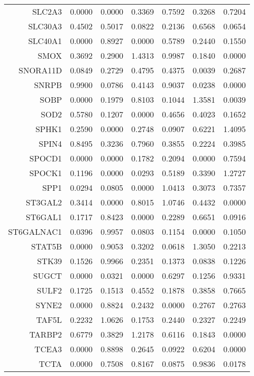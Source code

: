 \begin{longtable}{rrrrrrr}
  SLC2A3 & 0.0000 & 0.0000 & 0.3369 & 0.7592 & 0.3268 & 0.7204 \\ 
  SLC30A3 & 0.4502 & 0.5017 & 0.0822 & 0.2136 & 0.6568 & 0.0654 \\ 
  SLC40A1 & 0.0000 & 0.8927 & 0.0000 & 0.5789 & 0.2440 & 0.1550 \\ 
  SMOX & 0.3692 & 0.2900 & 1.4313 & 0.9987 & 0.1840 & 0.0000 \\ 
  SNORA11D & 0.0849 & 0.2729 & 0.4795 & 0.4375 & 0.0039 & 0.2687 \\ 
  SNRPB & 0.9900 & 0.0786 & 0.4143 & 0.9037 & 0.0238 & 0.0000 \\ 
  SOBP & 0.0000 & 0.1979 & 0.8103 & 0.1044 & 1.3581 & 0.0039 \\ 
  SOD2 & 0.5780 & 0.1207 & 0.0000 & 0.4656 & 0.4023 & 0.1652 \\ 
  SPHK1 & 0.2590 & 0.0000 & 0.2748 & 0.0907 & 0.6221 & 1.4095 \\ 
  SPIN4 & 0.8495 & 0.3236 & 0.7960 & 0.3855 & 0.2224 & 0.3985 \\ 
  SPOCD1 & 0.0000 & 0.0000 & 0.1782 & 0.2094 & 0.0000 & 0.7594 \\ 
  SPOCK1 & 0.1196 & 0.0000 & 0.0293 & 0.5189 & 0.3390 & 1.2727 \\ 
  SPP1 & 0.0294 & 0.0805 & 0.0000 & 1.0413 & 0.3073 & 0.7357 \\ 
  ST3GAL2 & 0.3414 & 0.0000 & 0.8015 & 1.0746 & 0.4432 & 0.0000 \\ 
  ST6GAL1 & 0.1717 & 0.8423 & 0.0000 & 0.2289 & 0.6651 & 0.0916 \\ 
  ST6GALNAC1 & 0.0396 & 0.9957 & 0.0803 & 0.1154 & 0.0000 & 0.1050 \\ 
  STAT5B & 0.0000 & 0.9053 & 0.3202 & 0.0618 & 1.3050 & 0.2213 \\ 
  STK39 & 0.1526 & 0.9966 & 0.2351 & 0.1373 & 0.0838 & 0.1226 \\ 
  SUGCT & 0.0000 & 0.0321 & 0.0000 & 0.6297 & 0.1256 & 0.9331 \\ 
  SULF2 & 0.1725 & 0.1513 & 0.4552 & 0.1878 & 0.3858 & 0.7665 \\ 
  SYNE2 & 0.0000 & 0.8824 & 0.2432 & 0.0000 & 0.2767 & 0.2763 \\ 
  TAF5L & 0.2232 & 1.0626 & 0.1753 & 0.2440 & 0.2327 & 0.2249 \\ 
  TARBP2 & 0.6779 & 0.3829 & 1.2178 & 0.6116 & 0.1843 & 0.0000 \\ 
  TCEA3 & 0.0000 & 0.8898 & 0.2645 & 0.0922 & 0.6204 & 0.0000 \\ 
  TCTA & 0.0000 & 0.7508 & 0.8167 & 0.0875 & 0.9836 & 0.0178 \\ 

\end{longtable}
